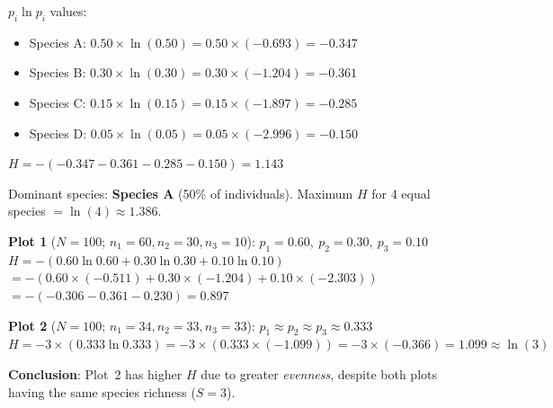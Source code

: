 \documentclass[11pt]{article}
\begin{document}
\vspace{0.4cm}

\begin{tcolorbox}[enhanced,colback=green!20,colframe=green!60!black,
  arc=6pt,boxrule=1.2pt,title=\textbf{\large Answer Key --- Part G3: Shannon-Weiner Calculation},
  fonttitle=\bfseries,coltitle=black,breakable]
$p_i \ln p_i$ values:
\begin{itemize}[noitemsep]
  \item Species A: $0.50 \times \ln(0.50) = 0.50 \times (-0.693) = -0.347$
  \item Species B: $0.30 \times \ln(0.30) = 0.30 \times (-1.204) = -0.361$
  \item Species C: $0.15 \times \ln(0.15) = 0.15 \times (-1.897) = -0.285$
  \item Species D: $0.05 \times \ln(0.05) = 0.05 \times (-2.996) = -0.150$
\end{itemize}
$H = -(-0.347 - 0.361 - 0.285 - 0.150) = \mathbf{1.143}$

Dominant species: \textbf{Species A} (50\% of individuals). Maximum $H$ for 4 equal species $= \ln(4) \approx 1.386$.
\end{tcolorbox}

\vspace{0.4cm}

\begin{tcolorbox}[enhanced,colback=green!20,colframe=green!60!black,
  arc=6pt,boxrule=1.2pt,title=\textbf{\large Answer Key --- Part I1: Shannon-Weiner},
  fonttitle=\bfseries,coltitle=black,breakable]
\textbf{Plot 1} ($N=100$; $n_1=60, n_2=30, n_3=10$):
$p_1=0.60,\ p_2=0.30,\ p_3=0.10$
$H = -(0.60\ln 0.60 + 0.30\ln 0.30 + 0.10\ln 0.10)$
$= -(0.60\times(-0.511) + 0.30\times(-1.204) + 0.10\times(-2.303))$
$= -(-0.306 - 0.361 - 0.230) = \mathbf{0.897}$

\textbf{Plot 2} ($N=100$; $n_1=34, n_2=33, n_3=33$):
$p_1 \approx p_2 \approx p_3 \approx 0.333$
$H = -3\times(0.333\ln 0.333) = -3\times(0.333\times(-1.099)) = -3\times(-0.366) = \mathbf{1.099} \approx \ln(3)$

\textbf{Conclusion}: Plot~2 has higher $H$ due to greater \textit{evenness}, despite both plots having the same species richness ($S=3$).
\end{tcolorbox}

\clearpage

\end{document}
